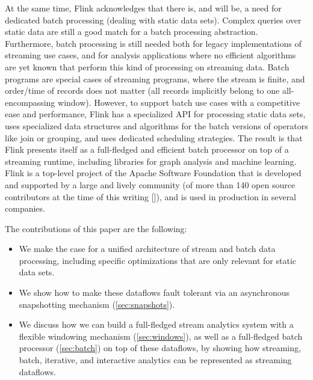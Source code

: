At the same time, Flink acknowledges that there is, and will be, a need for dedicated batch processing (dealing with static data sets). Complex queries over static data are still a good match for a batch processing abstraction. Furthermore, batch processing is still needed both for legacy implementations of streaming use cases, and for analysis applications where no efficient algorithms are yet known that perform this kind of processing on streaming data. Batch programs are special cases of streaming programs, where the stream is finite, and order/time of records does not matter (all records implicitly belong to one all-encompassing window). However, to support batch use cases with a competitive ease and performance, Flink has a specialized API for processing static data sets, uses specialized data structures and algorithms for the batch versions of operators like join or grouping, and uses dedicated scheduling strategies. The result is that Flink presents itself as a full-fledged and efficient batch processor on top of a streaming runtime, including libraries for graph analysis and machine learning. 
Flink is a top-level project of the Apache Software Foundation that is developed and supported by a large and lively community (of more than 140 open source contributors at the time of this writing []), and is used in production in several companies.


\noindent The contributions of this paper are the following:
\begin{itemize}
	\item We make the case for a unified architecture of stream and batch data processing, including specific optimizations that are only relevant for static data sets.
	\vspace{-3mm}
	\item We show how to make these dataflows fault tolerant via an asynchronous snapshotting mechanism (\autoref{sec:snapshots}).
	\vspace{-3mm}
	\item We discuss how we can build a full-fledged stream analytics system with a flexible windowing mechanism (\autoref{sec:windows}), as well as a full-fledged batch processor (\autoref{sec:batch}) on top of these dataflows, by showing how streaming, batch, iterative, and interactive analytics can be represented as streaming dataflows.
\end{itemize}
